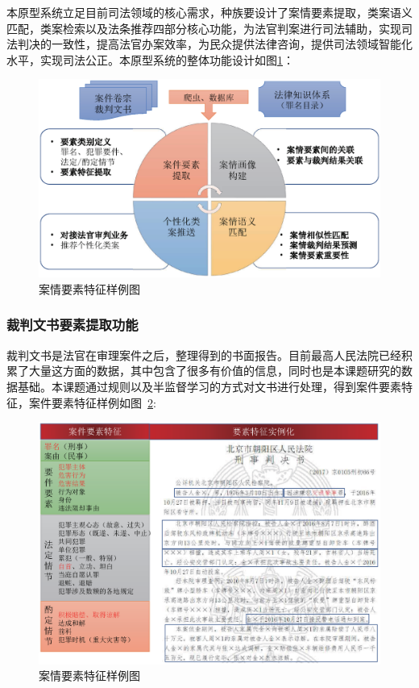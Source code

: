 本原型系统立足目前司法领域的核心需求，种族要设计了案情要素提取，类案语义匹配，类案检索以及法条推荐四部分核心功能，为法官判案进行司法辅助，实现司法判决的一致性，提高法官办案效率，为民众提供法律咨询，提供司法领域智能化水平，实现司法公正。本原型系统的整体功能设计如图\ref{fig:sys_main}：
\begin{figure}[htbp]%
    \centering
    \includegraphics[scale=0.5, clip=true]{./sources/sys_main.eps}
    \caption{\label{fig:sys_main}案情要素特征样例图}
\end{figure}



\subsubsection{裁判文书要素提取功能}

裁判文书是法官在审理案件之后，整理得到的书面报告。目前最高人民法院已经积累了大量这方面的数据，其中包含了很多有价值的信息，同时也是本课题研究的数据基础。本课题通过规则以及半监督学习的方式对文书进行处理，得到案件要素特征，案件要素特征样例如图~\ref{fig:sys_element_demo}:
\begin{figure}[htbp]%
    \centering
    \includegraphics[scale=0.5, clip=true]{./sources/sys_element_demo.eps}
    \caption{\label{fig:sys_element_demo}案情要素特征样例图}
\end{figure}

